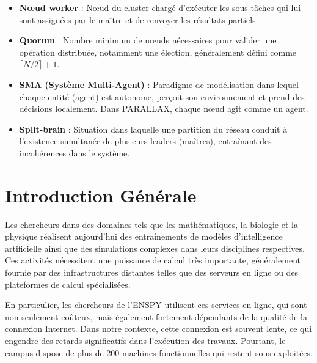 \documentclass[12pt,a4paper]{report}
\theoremstyle{definition}
\begin{document}
\begin{itemize}
    \item[*]  \textbf{Nœud worker} : Nœud du cluster chargé d’exécuter les sous-tâches qui lui sont assignées par le maître et de renvoyer les résultats partiels.

    \item[*]  \textbf{Quorum} : Nombre minimum de nœuds nécessaires pour valider une opération distribuée, notamment une élection, généralement défini comme $\lceil N/2 \rceil + 1$.

    \item [*] \textbf{SMA (Système Multi-Agent)} : Paradigme de modélisation dans lequel chaque entité (agent) est autonome, perçoit son environnement et prend des décisions localement. Dans PARALLAX, chaque nœud agit comme un agent.

    \item[*]  \textbf{Split-brain} : Situation dans laquelle une partition du réseau conduit à l’existence simultanée de plusieurs leaders (maîtres), entraînant des incohérences dans le système.

\end{itemize}

\listoffigures


\listoftables

\chapter*{Introduction Générale}

Les chercheurs dans des domaines tels que les mathématiques, la biologie et la physique réalisent aujourd’hui des entraînements de modèles d’intelligence artificielle ainsi que des simulations complexes dans leurs disciplines respectives. Ces activités nécessitent une puissance de calcul très importante, généralement fournie par des infrastructures distantes telles que des serveurs en ligne ou des plateformes de calcul spécialisées.

En particulier, les chercheurs de l’ENSPY utilisent ces services en ligne, qui sont non seulement coûteux, mais également fortement dépendants de la qualité de la connexion Internet. Dans notre contexte, cette connexion est souvent lente, ce qui engendre des retards significatifs dans l’exécution des travaux. Pourtant, le campus dispose de plus de 200 machines fonctionnelles qui restent sous-exploitées.
\end{document}

